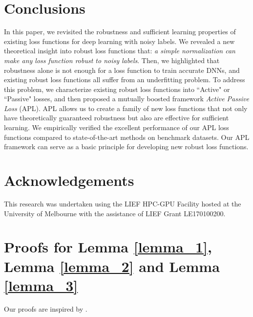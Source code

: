 \documentclass{article}
\begin{document}
\section{Conclusions}\label{sec:conclusion}
In this paper, we revisited the robustness and sufficient learning properties of existing loss functions for deep learning with noisy labels. We revealed a new theoretical insight into robust loss functions that: \emph{a simple normalization can make any loss function robust to noisy labels}. Then, we highlighted that robustness alone is not enough for a loss function to train accurate DNNs, and existing robust loss functions all suffer from an underfitting problem. To address this problem, we characterize existing robust loss functions into ``Active" or ``Passive" losses, and then proposed a mutually boosted framework \emph{Active Passive Loss} (APL). APL allows us to create a family of new loss functions that not only have theoretically guaranteed robustness but also are effective for sufficient learning.
We empirically verified the excellent performance of our APL loss functions compared to state-of-the-art methods on benchmark datasets.
Our APL framework can serve as a basic principle for developing new robust loss functions.

\section*{Acknowledgements}
This research was undertaken using the LIEF HPC-GPU Facility hosted at the University of Melbourne with the assistance of LIEF Grant LE170100200.

\vfill\pagebreak





\newpage
\appendix
\onecolumn

\setcounter{lemma}{0}

\section{Proofs for Lemma \ref{lemma_1}, Lemma \ref{lemma_2} and Lemma \ref{lemma_3}}\label{appendix_proof}
Our proofs are inspired by \cite{ghosh2017robust}.
\end{document}
